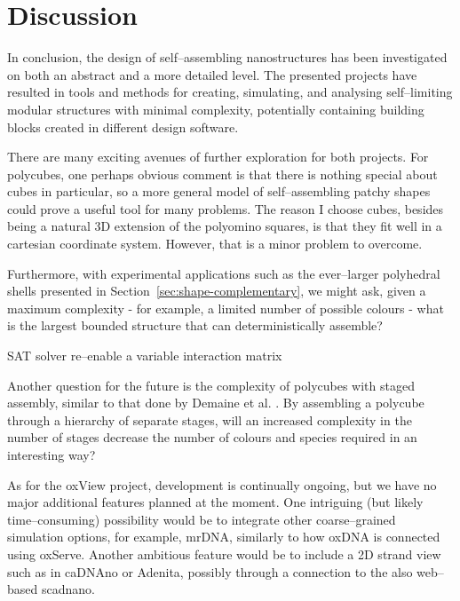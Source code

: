 \chapter{Discussion}
\label{ch:conclusion}

In conclusion, the design of self--assembling nanostructures has been investigated on both an abstract and a more detailed level. The presented projects have resulted in tools and methods for creating, simulating, and analysing self--limiting modular structures with minimal complexity, potentially containing building blocks created in different design software.


There are many exciting avenues of further exploration for both projects. For polycubes, one perhaps obvious comment is that there is nothing special about cubes in particular, so a more general model of self--assembling patchy shapes could prove a useful tool for many problems. The reason I choose cubes, besides being a natural 3D extension of the polyomino squares, is that they fit well in a cartesian coordinate system. However, that is a minor problem to overcome.


Furthermore, with experimental applications such as the ever--larger polyhedral shells presented in Section~\ref{sec:shape-complementary}, we might ask, given a maximum complexity - for example, a limited number of possible colours - what is the largest bounded structure that can deterministically assemble?

SAT solver re--enable a variable interaction matrix

Another question for the future is the complexity of polycubes with staged assembly, similar to that done by Demaine et al. \cite{demaine2008staged}. By assembling a polycube through a hierarchy of separate stages, will an increased complexity in the number of stages decrease the number of colours and species required in an interesting way?

As for the oxView project, development is continually ongoing, but we have no major additional features planned at the moment. One intriguing (but likely time--consuming) possibility would be to integrate other coarse--grained simulation options, for example, mrDNA, similarly to how oxDNA is connected using oxServe.
Another ambitious feature would be to include a 2D strand view such as in caDNAno or Adenita, possibly through a connection to the also web--based scadnano.